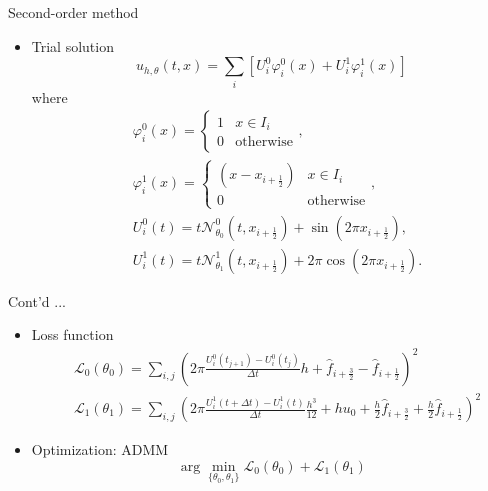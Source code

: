 \documentclass[aspectratio=169]{beamer}
\begin{document}
\begin{frame}{Second-order method}

\begin{itemize}
	\item Trial solution
	\begin{equation*}
	u_{h,\theta}(t,x) = \sum_{i} [U_i^0\varphi^0_{i}(x) + U_i^1\varphi^1_{i}(x) ]
	\end{equation*}
	where
	\begin{equation*}
	\begin{aligned}
	&
	\varphi^0_{i}(x) = \left\{\begin{matrix}
	1 & x \in I_{i}\\
	0 & \text{otherwise}
	\end{matrix}\right. , \\
	&\varphi^1_{i}(x) = \left\{\begin{matrix}
	(x-x_{i+\frac{1}{2}}) & x \in I_{i}\\
	0 & \text{otherwise}
	\end{matrix}\right. ,
	\\
	&U^0_i(t) = t\mathcal{N}^0_{\theta_0}(t,x_{i+\frac{1}{2}}) + \sin(2\pi x_{i+\frac{1}{2}}),\\
	&U^1_i(t) = t\mathcal{N}^1_{\theta_1}(t,x_{i+\frac{1}{2}}) + 2\pi\cos(2\pi x_{i+\frac{1}{2}}).
	\end{aligned}
	\end{equation*}
\end{itemize}
\end{frame}

\begin{frame}{Cont'd ...}

\begin{itemize}
	\item Loss function
	\begin{equation*}
	\begin{aligned}
	&\mathcal{L}_0(\theta_0) = \sum_{i,j}\left(2\pi\frac{U_i^0(t_{j+1} ) - U_i^0(t_j)}{\Delta t}  h + \hat{f}_{i+\frac{3}{2}} - \hat{f}_{i+\frac{1}{2}} \right)^2\\
	&\mathcal{L}_1(\theta_1) = \sum_{i,j}\left(2\pi\frac{U_i^1(t+\Delta t ) - U_i^1(t)}{\Delta t}  \frac{h^3}{12} + hu_0  + \frac{h}{2}\hat{f}_{i+\frac{3}{2}} +\frac{h}{2} \hat{f}_{i+\frac{1}{2}} \right)^2
	\end{aligned}
	\end{equation*}
	\item Optimization: ADMM 
	\begin{equation*}
	\arg\min_{\{\theta_0,\theta_1\}} \mathcal{L}_0(\theta_0) + \mathcal{L}_1(\theta_1)
	\end{equation*}
\end{itemize}
\end{frame}
\end{document}
